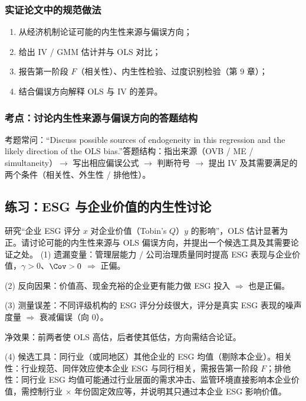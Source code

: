 \subsubsection{实证论文中的规范做法}

\begin{method}[实证论文处理内生性的步骤]
\begin{enumerate}[label=(\roman*)]
  \item 从经济机制论证可能的内生性来源与偏误方向；
  \item 给出 IV / GMM 估计并与 OLS 对比；
  \item 报告第一阶段 $F$（相关性）、内生性检验、过度识别检验（第 9 章）；
  \item 结合偏误方向解释 OLS 与 IV 的差异。
\end{enumerate}
\end{method}

\subsubsection{考点：讨论内生性来源与偏误方向的答题结构}

\begin{keypt}[讨论内生性的答题结构]
考题常问：“Discuss possible sources of endogeneity in this regression and the likely direction of the OLS bias.”答题结构：指出来源（OVB / ME / simultaneity）$\to$ 写出相应偏误公式 $\to$ 判断符号 $\to$ 提出 IV 及其需要满足的两个条件（相关性、外生性 / 排他性）。
\end{keypt}

\subsection{练习：ESG 与企业价值的内生性讨论}

\begin{prac}[实证情境的内生性讨论]\label{pr:U07-esg}
研究“企业 ESG 评分 $x$ 对企业价值（Tobin's $Q$）$y$ 的影响”，OLS 估计显著为正。请讨论可能的内生性来源与 OLS 偏误方向，并提出一个候选工具及其需要论证之处。
\answer
(1) 遗漏变量：管理层能力 / 公司治理质量同时提高 ESG 表现与企业价值，$\gamma>0$、$\Cov>0$ $\Rightarrow$ 正偏。

(2) 反向因果：价值高、现金充裕的企业更有能力做 ESG 投入 $\Rightarrow$ 也是正偏。

(3) 测量误差：不同评级机构的 ESG 评分分歧很大，评分是真实 ESG 表现的噪声度量 $\Rightarrow$ 衰减偏误（向 0）。

净效果：前两者使 OLS 高估，后者使其低估，方向需结合论证。

(4) 候选工具：同行业（或同地区）其他企业的 ESG 均值（剔除本企业）。相关性：行业规范、同伴效应使本企业 ESG 与同行相关，需报告第一阶段 $F$；排他性：同行业 ESG 均值可能通过行业层面的需求冲击、监管环境直接影响本企业价值，需控制行业 $\times$ 年份固定效应等，并说明其只通过本企业 ESG 影响价值。
\end{prac}

